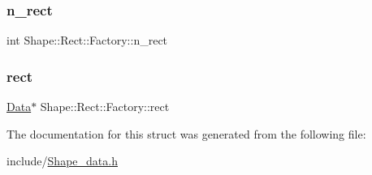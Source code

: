 \subsubsection{\texorpdfstring{n\+\_\+rect}{n\_rect}}
{\footnotesize\ttfamily int Shape\+::\+Rect\+::\+Factory\+::n\+\_\+rect}

\mbox{\label{struct_shape_1_1_rect_1_1_factory_a72395ba123b6649287ba2f84c7bcc9b5}} 
\subsubsection{\texorpdfstring{rect}{rect}}
{\footnotesize\ttfamily \mbox{\hyperlink{struct_shape_1_1_rect_1_1_data}{Data}}$\ast$ Shape\+::\+Rect\+::\+Factory\+::rect}



The documentation for this struct was generated from the following file\+:\begin{DoxyCompactItemize}
\item 
include/\mbox{\hyperlink{_shape__data_8h}{Shape\+\_\+data.\+h}}\end{DoxyCompactItemize}
